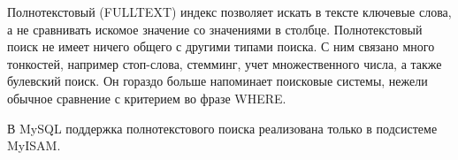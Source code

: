 Полнотекстовый (FULLTEXT) индекс позволяет искать в тексте ключевые слова, а не сравнивать искомое значение со значениями в столбце. Полнотекстовый поиск не имеет ничего общего с другими типами поиска. С ним связано много тонкостей, например стоп-слова, стемминг, учет множественного числа, а также булевский поиск. Он гораздо больше напоминает поисковые системы, нежели обычное сравнение с критерием во фразе WHERE.

В MySQL поддержка полнотекстового поиска реализована только в подсистеме MyISAM.

